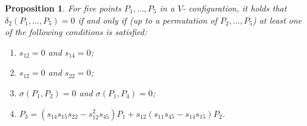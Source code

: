 \documentclass[a4paper, 11pt, reqno]{amsart}
\theoremstyle{plain}
\newtheorem{prop}[lemma]{Proposition}
\theoremstyle{definition}
\begin{document}
\begin{prop}
\label{proposition:definitionP3}
For five points $P_1, \dots, P_5$ in a $V$- configuration, it holds that
$\delta_2(P_1, \dotsc, P_5) = 0$ if and only if (up to a permutation of $P_2, \dots, P_5$) at least one of the following conditions
is satisfied:
%
\begin{enumerate}
  \item $s_{12} = 0$ and $s_{14} = 0$;
  \label{defP3_1}
  \item $s_{12} = 0$ and $s_{22} = 0$;
  \label{defP3_2}
  \item $\sigma(P_1, P_2) = 0$ and $\sigma(P_1, P_4) = 0$;
  \label{defP3_3}
  \item $P_3 = (s_{14}s_{15}s_{22}-s_{12}^2s_{45})P_1  +s_{12}(s_{11}s_{45}-s_{14}s_{15})P_2$.
  \label{defP3_4}
\end{enumerate}
%
\end{prop}
\end{document}
